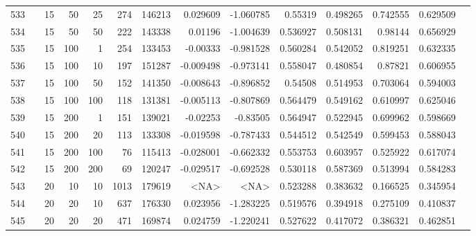 \begin{longtable}{llrrrrrrrrrrrr}
		533 & &           15 &                50 &           25 &         274 &     146213 &  0.029609 & -1.060785 &   0.55319 &    0.498265 &       0.742555 &  0.629509 \\
		534 & &           15 &                50 &           50 &         222 &     143338 &   0.01196 & -1.004639 &  0.536927 &    0.508131 &        0.98144 &  0.656929 \\
		535 & &           15 &               100 &            1 &         254 &     133453 &  -0.00333 & -0.981528 &  0.560284 &    0.542052 &       0.819251 &  0.632335 \\
		536 & &           15 &               100 &           10 &         197 &     151287 & -0.009498 & -0.973141 &  0.558047 &    0.480854 &        0.87821 &  0.606955 \\
		537 & &           15 &               100 &           50 &         152 &     141350 & -0.008643 & -0.896852 &   0.54508 &    0.514953 &       0.703064 &  0.594003 \\
		538 & &           15 &               100 &          100 &         118 &     131381 & -0.005113 & -0.807869 &  0.564479 &    0.549162 &       0.610997 &  0.625046 \\
		539 & &           15 &               200 &            1 &         151 &     139021 &  -0.02253 &  -0.83505 &  0.564947 &    0.522945 &       0.699962 &  0.598669 \\
		540 & &           15 &               200 &           20 &         113 &     133308 & -0.019598 & -0.787433 &  0.544512 &    0.542549 &       0.599453 &  0.588043 \\
		541 & &           15 &               200 &          100 &          76 &     115413 & -0.028001 & -0.662332 &  0.553753 &    0.603957 &       0.525922 &  0.617074 \\
		542 & &           15 &               200 &          200 &          69 &     120247 & -0.029517 & -0.692528 &  0.530118 &    0.587369 &       0.513994 &  0.584283 \\
		543 & &           20 &                10 &           10 &           1013 &     179619 &      <NA> &      <NA> &  0.523288 &    0.383632 &       0.166525 &  0.345954 \\
		544 & &           20 &                20 &           10 &         637 &     176330 &  0.023956 & -1.283225 &  0.519576 &    0.394918 &       0.275109 &  0.410837 \\
		545 & &           20 &                20 &           20 &         471 &     169874 &  0.024759 & -1.220241 &  0.527622 &    0.417072 &       0.386321 &  0.462851 \\

\end{longtable}
